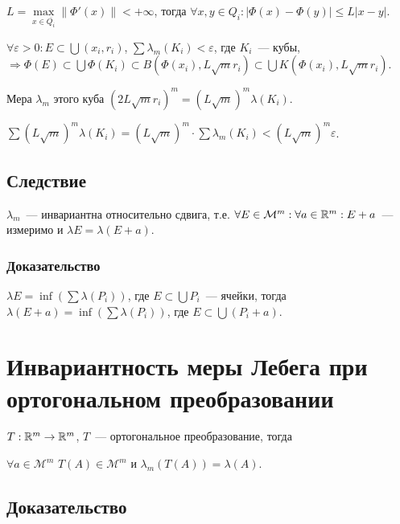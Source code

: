 \documentclass{article}
\begin{document}
            $L = \max\limits_{x \in \overline{Q_i}} \| \Phi'(x) \| < +\infty$, тогда $\forall x, y \in Q_i : \left| \Phi(x) - \Phi(y) \right| \leqslant L |x - y|$.
            
            $\forall \varepsilon > 0 : E \subset \bigcup (x_i, r_i)$, $\sum \lambda_m(K_i) < \varepsilon$, где $K_i$~--- кубы, $\Rightarrow \Phi(E) \subset \bigcup \Phi(K_i) \subset B(\Phi(x_i), L \sqrt{m} r_i) \subset \bigcup K \left( \Phi(x_i), L \sqrt{m} r_i \right)$.
            
            Мера $\lambda_m$ этого куба $\left( 2 L \sqrt{m} r_i \right)^m = (L \sqrt{m})^m \lambda (K_i)$.
            
            $\sum \left( L \sqrt{m} \right)^m \lambda(K_i) = (L \sqrt{m})^m \cdot \sum \lambda_m (K_i) < (L \sqrt{m})^m \varepsilon$.
            
        \subsection{Следствие}
        
            $\lambda_m$~--- инвариантна относительно сдвига, т.е. $\forall E \in \mathcal{M}^m : \forall a \in \mathbb{R}^m : E + a$~--- измеримо и $\lambda E = \lambda (E + a)$.
            
            \subsubsection{Доказательство}
            
                $\lambda E = \inf \left( \sum \lambda(P_i) \right)$, где $E \subset \bigcup P_i$~--- ячейки, тогда $\lambda (E + a) = \inf \left( \sum \lambda (P_i) \right)$, где $E \subset \bigcup \left( P_i + a \right)$.
                
    \newpage
    
    \section{Инвариантность меры Лебега при ортогональном преобразовании}
    
        $T : \mathbb{R}^m \rightarrow \mathbb{R}^m$, $T$~--- ортогональное преобразование, тогда
        
        $\forall a \in \mathcal{M}^m$ $T(A) \in \mathcal{M}^m$ и $\lambda_m(T(A)) = \lambda(A)$.
        
        \subsection{Доказательство}
        
\end{document}
